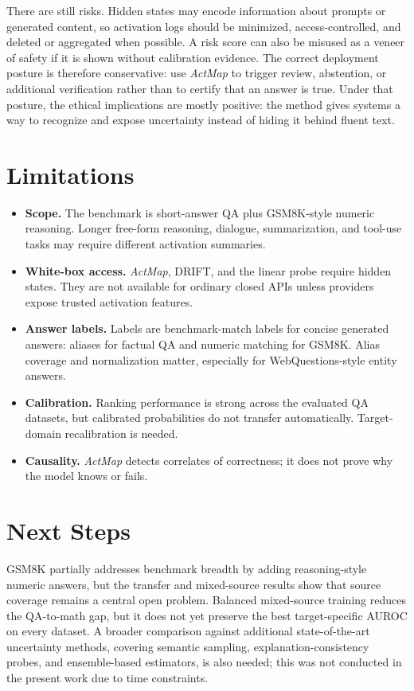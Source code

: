 \documentclass{article}
\newcommand{\actmap}{\textit{ActMap}}
\begin{document}
There are still risks. Hidden states may encode information about prompts or generated content, so activation logs should be minimized, access-controlled, and deleted or aggregated when possible. A risk score can also be misused as a veneer of safety if it is shown without calibration evidence. The correct deployment posture is therefore conservative: use \actmap{} to trigger review, abstention, or additional verification rather than to certify that an answer is true. Under that posture, the ethical implications are mostly positive: the method gives systems a way to recognize and expose uncertainty instead of hiding it behind fluent text.

\section{Limitations}

\begin{itemize}
    \item \textbf{Scope.} The benchmark is short-answer QA plus GSM8K-style numeric reasoning. Longer free-form reasoning, dialogue, summarization, and tool-use tasks may require different activation summaries.
    \item \textbf{White-box access.} \actmap{}, DRIFT, and the linear probe require hidden states. They are not available for ordinary closed APIs unless providers expose trusted activation features.
    \item \textbf{Answer labels.} Labels are benchmark-match labels for concise generated answers: aliases for factual QA and numeric matching for GSM8K. Alias coverage and normalization matter, especially for WebQuestions-style entity answers.
    \item \textbf{Calibration.} Ranking performance is strong across the evaluated QA datasets, but calibrated probabilities do not transfer automatically. Target-domain recalibration is needed.
    \item \textbf{Causality.} \actmap{} detects correlates of correctness; it does not prove why the model knows or fails.
\end{itemize}

\section{Next Steps}

GSM8K partially addresses benchmark breadth by adding reasoning-style numeric answers, but the transfer and mixed-source results show that source coverage remains a central open problem. Balanced mixed-source training reduces the QA-to-math gap, but it does not yet preserve the best target-specific AUROC on every dataset. A broader comparison against additional state-of-the-art uncertainty methods, covering semantic sampling, explanation-consistency probes, and ensemble-based estimators, is also needed; this was not conducted in the present work due to time constraints.
\end{document}
